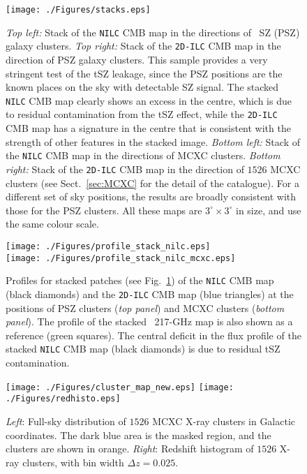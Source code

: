 \documentclass[traditabstract, longauth]{aa}
\newcommand{\1}{\'\i }
\begin{document}
\begin{figure}
\texttt{[image: ./Figures/stacks.eps]}
\caption[fig:stacking]{\emph{Top left:} Stack of the
{\tt NILC} CMB map in the directions of \Planck\ SZ (PSZ) galaxy clusters.
\emph{Top right:} Stack of the {\tt 2D-ILC} CMB map
in the direction of PSZ galaxy clusters.  This sample provides a very stringent
test of the tSZ leakage, since the PSZ positions are the known places on the
sky with detectable SZ signal.  The stacked {\tt NILC} CMB map clearly shows
an excess in the centre, which is due to residual
contamination from the tSZ effect, while the {\tt 2D-ILC} CMB map has a
signature in the centre that is consistent with the strength of other features
in the stacked image.  \emph{Bottom left:} Stack of the
{\tt NILC} CMB map in the directions of MCXC clusters.  \emph{Bottom right:}
Stack of the {\tt 2D-ILC} CMB map
in the direction of $1526$ MCXC clusters (see Sect.~\ref{sec:MCXC} for the detail of the catalogue).  For a different set of sky positions, the
results are broadly consistent with those for the PSZ clusters.  All these
maps are $3^\circ \times 3^\circ$ in size, and use the same colour scale.}
\label{fig:stacking}
\end{figure}

\begin{figure}
\centering
\texttt{[image: ./Figures/profile\_stack\_nilc.eps]}\\
\texttt{[image: ./Figures/profile\_stack\_nilc\_mcxc.eps]}
\caption[fig:profiles]{Profiles for stacked patches (see
Fig.~\ref{fig:stacking}) of the {\tt NILC} CMB map (black diamonds) and the
{\tt 2D-ILC} CMB map (blue triangles) at the positions of PSZ clusters (\emph{top panel}) and MCXC clusters (\emph{bottom panel}).
The profile of the stacked \Planck\
217-GHz map is also shown as a reference (green squares). The central deficit
in the flux profile of the stacked {\tt NILC} CMB map (black diamonds) is due
to residual tSZ contamination.}
\label{fig:profiles}
\end{figure}


\begin{figure*}
\centering
\centerline{
\texttt{[image: ./Figures/cluster\_map\_new.eps]}
\texttt{[image: ./Figures/redhisto.eps]}}
\caption[fig:cluster]{{\it Left}: Full-sky distribution of $1526$ MCXC X-ray
clusters \citep{pif,planck2013-XIII} in Galactic coordinates. The dark blue
area is the masked region, and the clusters are shown in orange. {\it Right}:
Redshift histogram of $1526$ X-ray clusters, with bin width $\Delta z=0.025$.}
\label{fig:cluster}
\end{figure*}
\end{document}
